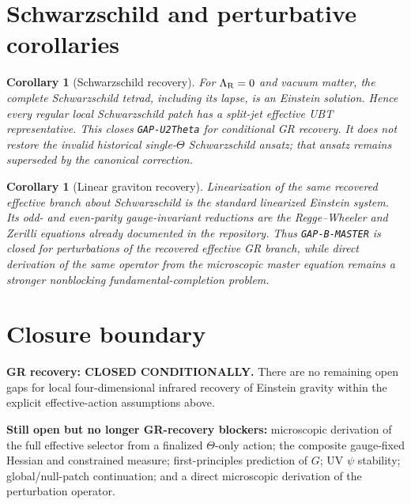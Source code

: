\documentclass[11pt,a4paper]{article}
\newtheorem{corollary}[theorem]{Corollary}
\begin{document}
\section{Schwarzschild and perturbative corollaries}
\begin{corollary}[Schwarzschild recovery]
For $\Lambda_{\rm R}=0$ and vacuum matter, the complete Schwarzschild tetrad,
including its lapse, is an Einstein solution.  Hence every regular local
Schwarzschild patch has a split-jet effective UBT representative.  This closes
\texttt{GAP-U2Theta} \emph{for conditional GR recovery}.  It does not restore
the invalid historical single-$\Theta$ Schwarzschild ansatz; that ansatz
remains superseded by the canonical correction.
\end{corollary}

\begin{corollary}[Linear graviton recovery]
Linearization of the same recovered effective branch about Schwarzschild is the
standard linearized Einstein system.  Its odd- and even-parity gauge-invariant
reductions are the Regge--Wheeler and Zerilli equations already documented in
the repository.  Thus \texttt{GAP-B-MASTER} is closed for perturbations of the
recovered effective GR branch, while direct derivation of the same operator
from the microscopic master equation remains a stronger nonblocking
fundamental-completion problem.
\end{corollary}

\section{Closure boundary}
\begin{tcolorbox}[colback=green!6!white,colframe=green!55!black,title=Exact verdict]
\textbf{GR recovery: CLOSED CONDITIONALLY.}  There are no remaining open gaps
for local four-dimensional infrared recovery of Einstein gravity within the
explicit effective-action assumptions above.

\medskip
\textbf{Still open but no longer GR-recovery blockers:} microscopic derivation
of the full effective selector from a finalized $\Theta$-only action; the
composite gauge-fixed Hessian and constrained measure; first-principles
prediction of $G$; UV $\psi$ stability; global/null-patch continuation; and a
direct microscopic derivation of the perturbation operator.
\end{tcolorbox}
\end{document}
